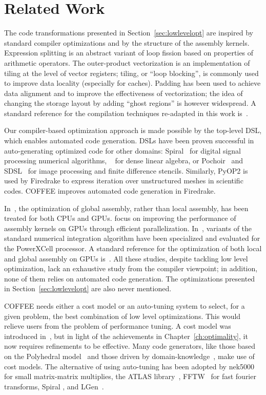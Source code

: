 \section{Related Work}
\label{sec:coffee-related-work}
The code transformations presented in Section~\ref{sec:lowlevelopt} are inspired by standard compiler optimizations and by the structure of the assembly kernels. Expression splitting is an abstract variant of loop fission based on properties of arithmetic operators. The outer-product vectorization is an implementation of tiling at the level of vector registers; tiling, or ``loop blocking'', is commonly used to improve data locality (especially for caches). Padding has been used to achieve data alignment and to improve the effectiveness of vectorization; the idea of changing the storage layout by adding ``ghost regions'' is however widespread. A standard reference for the compilation techniques re-adapted in this work is~\cite{dragonbook}.

Our compiler-based optimization approach is made possible by the top-level DSL, which enables automated code generation. DSLs have been proven successful in auto-generating optimized code for other domains: Spiral~\citep{Pueschel:05} for digital signal processing numerical algorithms, ~\citep{Spampinato:14} for dense linear algebra, or Pochoir~\citep{pochoir} and SDSL~\citep{stencil-compiler} for image processing and finite difference stencils. Similarly, PyOP2 is used by Firedrake to express iteration over unstructured meshes in scientific codes. COFFEE improves automated code generation in Firedrake.

In~\cite{Markall20101815}, the optimization of global assembly, rather than local assembly, has been treated for both CPUs and GPUs. \cite{petsc-integration-gpu} focus on improving the performance of assembly kernels on GPUs through efficient parallelization. In~\cite{assembly-opencl}, variants of the standard numerical integration algorithm have been specialized and evaluated for the PowerXCell processor. A standard reference for the optimization of both local and global assembly on GPUs is~\citep{fem-gpu-study}. All these studies, despite tackling low level optimization, lack an exhaustive study from the compiler viewpoint; in addition, none of them relies on automated code generation. The optimizations presented in Section~\ref{sec:lowlevelopt} are also never mentioned. 

COFFEE needs either a cost model or an auto-tuning system to select, for a given problem, the best combination of low level optimizations. This would relieve users from the problem of performance tuning. A cost model was introduced in~\cite{Luporini-coffee}, but in light of the achievements in Chapter~\ref{ch:optimality}, it now requires refinements to be effective. Many code generators, like those based on the Polyhedral model~\citep{pluto} and those driven by domain-knowledge~\citep{modeldriven}, make use of cost models. The alternative of using auto-tuning has been adopted by nek5000~\citep{nek5000} for small matrix-matrix multiplies, the ATLAS library~\citep{ATLAS}, FFTW~\citep{FFTW} for fast fourier transforms, Spiral \citep{Pueschel:05}, and LGen~\citep{Spampinato:14}. 


